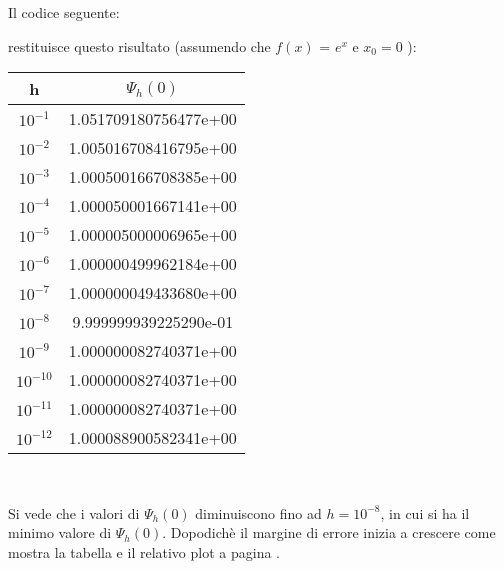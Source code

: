 \begin{flushleft}
Il codice seguente:

restituisce questo risultato (assumendo che $f(x)$ = $ e^x $ e $ x_0 = 0 $ ): 
\begin{center}
\begin{tabular}{|c|c|}
\hline
h & \( \Psi_{h}(0) \)  \\
\hline
    \(10^{-1}\) & 1.051709180756477e+00\\
    \(10^{-2}\) & 1.005016708416795e+00\\
    \(10^{-3}\) & 1.000500166708385e+00\\
    \(10^{-4}\) & 1.000050001667141e+00\\
    \(10^{-5}\) & 1.000005000006965e+00\\
    \(10^{-6}\) & 1.000000499962184e+00\\
    \(10^{-7}\) & 1.000000049433680e+00\\
    \(10^{-8}\) & 9.999999939225290e-01\\
    \(10^{-9}\) & 1.000000082740371e+00\\
    \(10^{-10}\) & 1.000000082740371e+00\\
    \(10^{-11}\) & 1.000000082740371e+00\\
    \(10^{-12}\) & 1.000088900582341e+00\\
\hline
\end{tabular} \\
\end{center}
Si vede che i valori di $\Psi_{h}(0)$ diminuiscono fino ad $h = 10^{-8}$, in cui si ha il minimo valore di $\Psi_{h}(0)$. Dopodichè il margine di errore inizia a crescere come mostra la tabella e il relativo plot a pagina \pageref{fes14}.
\end{flushleft}